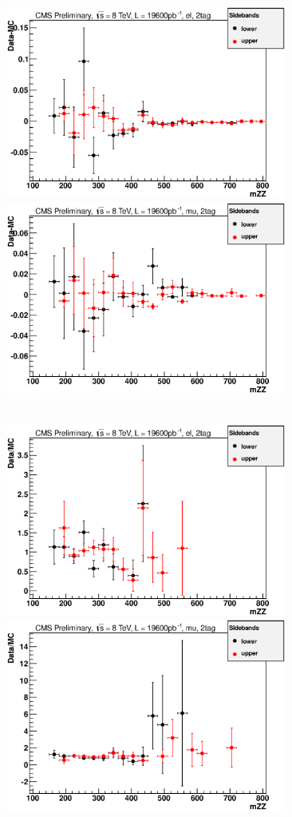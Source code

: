 \begin{figure}[htb!]
\centerline{
\includegraphics[height=2.5in]{Systematics/plots/subtract_el_2_2}
\includegraphics[height=2.5in]{Systematics/plots/subtract_mu_2_2}}
\centerline{
\\
\includegraphics[height=2.5in]{Systematics/plots/divide_el_2_2}
\includegraphics[height=2.5in]{Systematics/plots/divide_mu_2_2}
}
\end{figure}
